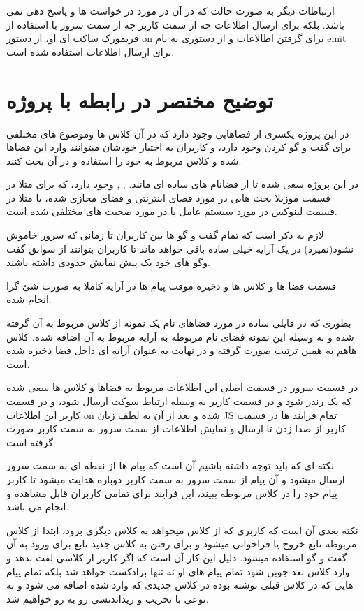\documentclass{article}
\begin{document}
ارتباطات دیگر به صورت حالت
که در آن در مورد 
در خواست ها
و پاسخ دهی
نمی باشد.
بلکه برای ارسال اطلاعات چه از سمت کاربر چه از سمت سرور با استفاده از
فریمورک ساکت ای او، از دستور on برای گرفتن اطالاعات
و از دستوری به نام emit برای ارسال اطلاعات استفاده شده است.


\section{توضیح مختصر در رابطه با پروژه}
در این پروژه یکسری از فضاهایی وجود دارد که در آن کلاس ها وموضوع های 
مختلفی برای گفت و گو کردن وجود دارد، و کاربران به اختیار خودشان میتوانند وارد این 
فضاها شده و کلاس مربوط به خود را استفاده و در آن بحث کنند.

در این پروژه سعی شده تا از فضانام های ساده ای مانند.
, , 
وجود دارد، که برای مثلا در قسمت موزیلا بحث هایی در مورد فضای اینترنتی و فضای مجازی
شده، یا مثلا در قسمت لینوکس در مورد سیستم عامل
یا در مورد 
صحبت های مختلفی شده است.

لازم به ذکر است که تمام گفت و گو ها بین کاربران تا زمانی که سرور خاموش نشود(نمیرد)
در یک آرایه خیلی ساده باقی خواهد ماند تا کاربران بتوانند از سوابق گفت وگو های 
خود یک پیش نمایش حدودی داشته باشند.

قسمت فضا ها و کلاس ها و ذخیره موقت پیام ها در آرایه کاملا به صورت شئ گرا انجام شده.

بطوری که در فایلی ساده در مورد فضاهای نام یک نمونه از کلاس مربوط به آن گرفته شده و 
به وسیله این نمونه فضای نام مربوطه به آرایه مربوط به آن اضافه شده. کلاس هاهم به همین ترتیب
صورت گرفته و در نهایت به عنوان آرایه ای داخل فضا ذخیره شده است.

در قسمت سرور در قسمت اصلی این اطلاعات مربوط به فضاها و کلاس ها سعی شده که یک رندر شود
و در قسمت کاربر به وسیله ارتباط سوکت ارسال شود، و در قسمت کاربر این اطلاعات on
شده و بعد از آن به لطف زبان JS
تمام فرایند ها در قسمت کاربر از صدا زدن تا ارسال و نمایش اطلاعات از سمت سرور به 
سمت کاربر صورت گرفته است.

نکته ای که باید توجه داشته باشیم آن است که پیام ها از نقطه ای به سمت سرور ارسال میشود
و آن پیام از سمت سرور به سمت کاربر دوباره هدایت میشود تا کاربر پیام خود را در 
کلاس مربوطه ببیند، این فرایند برای تمامی کاربران قابل مشاهده و انجام می باشد.

نکته بعدی آن است که کاربری که از کلاس میخواهد به کلاس دیگری برود، 
ابتدا از کلاس مربوطه تابع خروج یا 
فراخوانی میشود و برای رفتن به کلاس جدید تابع 
برای ورود به آن گفت و گو استفاده میشود.
دلیل این کار آن است که اگر کاربر از کلاسی لفت ندهد و وارد کلاس بعد جوین شود 
تمام پیام های او نه تنها برادکست خواهد شد بلکه تمام پیام هایی که در کلاس قبلی نوشته 
بوده در کلاس جدیدی که وارد شده اضافه می شود و به نوعی با تخریب و ریداندنسی رو به رو خواهیم شد.
\end{document}
